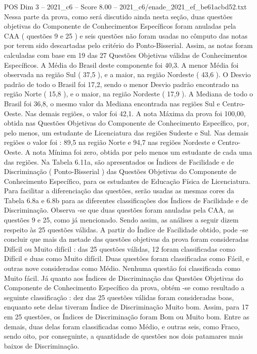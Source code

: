 \begin{textsample}{POS Dim 3 – 2021\_c6 – Score 8.00 – 2021\_c6/enade\_2021\_ef\_be61acbd52.txt}
Nessa parte da prova, como será discutido ainda nesta seção, duas questões objetivas do Componente de Conhecimentos Específicos foram anuladas pela CAA ( questões 9 e 25 ) e seis questões não foram usadas no cômputo das notas por terem sido descartadas pelo critério do Ponto-Bisserial.
Assim, as notas foram calculadas com base em 19 das 27 Questões Objetivas válidas de Conhecimentos Específicos.
A Média do Brasil deste componente foi 40,3.
A menor Média foi observada na região Sul ( 37,5 ), e a maior, na região Nordeste ( 43,6 ).
O Desvio padrão de todo o Brasil foi 17,2, sendo o menor Desvio padrão encontrado na região Norte ( 15,8 ), e o maior, na região Nordeste ( 17,9 ).
A Mediana de todo o Brasil foi 36,8, o mesmo valor da Mediana encontrada nas regiões Sul e Centro-Oeste.
Nas demais regiões, o valor foi 42,1.
A nota Máxima da prova foi 100,00, obtida nas Questões Objetivas do Componente de Conhecimento Específico, por, pelo menos, um estudante de Licenciatura das regiões Sudeste e Sul.
Nas demais regiões o valor foi : 89,5 na região Norte e 94,7 nas regiões Nordeste e Centro-Oeste.
A nota Mínima foi zero, obtida por pelo menos um estudante de cada uma das regiões.
Na Tabela 6.11a, são apresentados os Índices de Facilidade e de Discriminação ( Ponto-Bisserial ) das Questões Objetivas do Componente de Conhecimento Específico, para os estudantes de Educação Física de Licenciatura.
Para facilitar a diferenciação das questões, serão usadas as mesmas cores da Tabela 6.8a e 6.8b para as diferentes classificações dos Índices de Facilidade e de Discriminação.
Observa -se que duas questões foram anuladas pela CAA, as questões 9 e 25, como já mencionado.
Sendo assim, as análises a seguir dizem respeito às 25 questões válidas.
A partir do Índice de Facilidade obtido, pode -se concluir que mais da metade das questões objetivas da prova foram consideradas Difícil ou Muito difícil : das 25 questões válidas, 12 foram classificadas como Difícil e duas como Muito difícil.
Duas questões foram classificadas como Fácil, e outras nove consideradas como Médio.
Nenhuma questão foi classificada como Muito fácil.
Já quanto aos Índices de Discriminação das Questões Objetivas do Componente de Conhecimento Específico da prova, obtém -se como resultado a seguinte classificação : dez das 25 questões válidas foram consideradas boas, enquanto sete delas tiveram Índice de Discriminação Muito bom.
Assim, para 17 em 25 questões, os Índices de Discriminação foram Bom ou Muito bom.
Entre as demais, duas delas foram classificadas como Médio, e outras seis, como Fraco, sendo oito, por conseguinte, a quantidade de questões nos dois patamares mais baixos de Discriminação.

\end{textsample}
